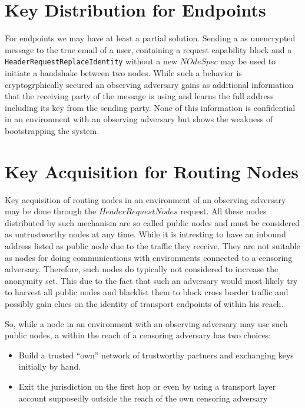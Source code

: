 \section{Key Distribution for Endpoints}
For endpoints we may have at least a partial solution. Sending a \VortexMessage as unencrypted message to the true email of a user, containing a request capability block and a \texttt{HeaderRequestReplaceIdentity} without a new $NOdeSpec$ may be used to initiate a handshake between two nodes. While such a behavior is cryptogrphically secured an observing adversary gains as additional information that the receiving party of the message is using \MessageVortex{} and learns the full address including its key from the sending party. None of this information is confidential in an environment with an observing adversary but shows the weakness of bootstrapping the system.

\section{Key Acquisition for Routing Nodes}
Key acquisition of routing nodes in an environment of an observing adversary may be done through the $HeaderRequestNodes$ request. All these nodes distributed by such mechanism are so called public nodes and must be considered as untrustworthy nodes at any time. While it is intresting to have an inbound address listed as public node due to the traffic they receive. They are not suitable as nodes for doing communications with environments connected to a censoring adversary. Therefore, such nodes do typically not considered to increase the anonymity set. This due to the fact that such an adversary would most likely try to harvest all public nodes and blacklist them to block cross border traffic and possibly gain clues on the identity of transport endpoints of \VortexNodes{} within his reach.

So, while a node in an environment with an observing adversary may use such public nodes, a \VortexNode{} within the reach of a censoring adversary has two choices:
\begin{itemize}
	\item Build a trusted ``own'' network of trustworthy partners and exchanging keys initially by hand.
	\item Exit the jurisdiction on the first hop or even by using a transport layer account supposedly outside the reach of the own censoring adversary
\end{itemize}

